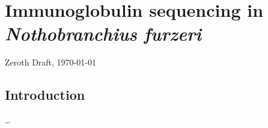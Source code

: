 
\chapter{Immunoglobulin sequencing in \textit{Nothobranchius furzeri}} 
\label{chap:igseq} 
\onehalfspacing

\ifdefineChapter
	{\LARGE Zeroth Draft, \today}
\fi

\pagebreak

\section{Introduction}
\label{sec:igseq_intro}

\dots

%
%

